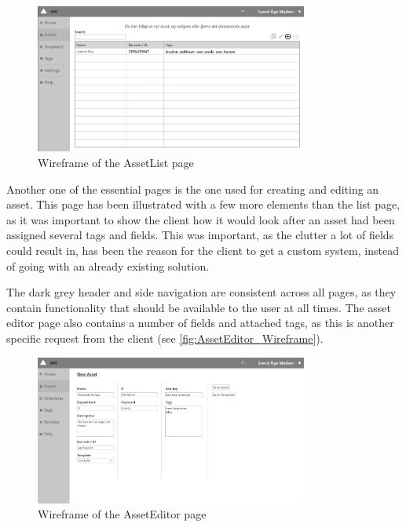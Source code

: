 \begin{figure}[H]
    \centering
    \includegraphics[width=0.8\textwidth]{figures/wireframes/AssetList_Wireframe.png}
    \caption{Wireframe of the AssetList page}
    \label{fig:AssetList_Wireframe}
\end{figure}

Another one of the essential pages is the one used for creating and editing an asset. This page has been illustrated with a few more elements than the list page, as it was important to show the client how it would look after an asset had been assigned several tags and fields. This was important, as the clutter  a lot of fields could result in, has been the reason for the client to get a custom system, instead of going with an already existing solution. 
\par
The dark grey header and side navigation are consistent across all pages, as they contain functionality that should be available to the user at all times. The asset editor page also contains a number of fields and attached tags, as this is another specific request from the client (see \autoref{fig:AssetEditor_Wireframe}).

\begin{figure}[H]
    \centering
    \includegraphics[width=0.8\textwidth]{figures/wireframes/AssetEditor_Wireframe.png}
    \caption{Wireframe of the AssetEditor page}
    \label{fig:AssetEditor_Wireframe}
\end{figure}

